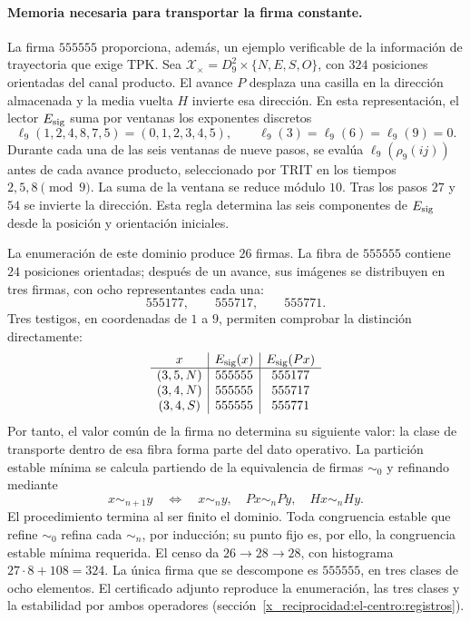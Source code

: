 \paragraph{Memoria necesaria para transportar la firma constante.}
La firma \(555555\) proporciona, además, un ejemplo verificable de
la información de trayectoria que exige TPK. Sea
\(\mathcal X_\times=D_9^2\times\{N,E,S,O\}\), con \(324\)
posiciones orientadas del canal producto. El avance \(P\) desplaza
una casilla en la dirección almacenada y la media vuelta \(H\)
invierte esa dirección. En esta representación, el lector
\(E_{\rm sig}\) suma por ventanas los exponentes discretos
\[
 \ell_9(1,2,4,8,7,5)=(0,1,2,3,4,5),\qquad
 \ell_9(3)=\ell_9(6)=\ell_9(9)=0.
\]
Durante cada una de las seis ventanas de nueve pasos, se evalúa
\(\ell_9(\rho_9(ij))\) antes de cada avance producto, seleccionado
por TRIT en los tiempos \(2,5,8\pmod9\). La suma de la ventana se
reduce módulo \(10\). Tras los pasos \(27\) y \(54\) se invierte
la dirección. Esta regla determina las seis componentes de
\(E_{\rm sig}\) desde la posición y orientación iniciales.

La enumeración de este dominio produce \(26\) firmas. La fibra de
\(555555\) contiene \(24\) posiciones orientadas; después de un
avance, sus imágenes se distribuyen en tres firmas, con ocho
representantes cada una:
\[
 555177,\qquad555717,\qquad555771.
\]
Tres testigos, en coordenadas de \(1\) a \(9\), permiten comprobar
la distinción directamente:
\[
\begin{array}{c|c|c}
x&E_{\rm sig}(x)&E_{\rm sig}(Px)\\\hline
(3,5,N)&555555&555177\\
(3,4,N)&555555&555717\\
(3,4,S)&555555&555771
\end{array}
\]
Por tanto, el valor común de la firma no determina su siguiente valor:
la clase de transporte dentro de esa fibra forma parte del dato
operativo. La partición estable mínima se calcula partiendo de la
equivalencia de firmas \(\sim_0\) y refinando mediante
\[
 x\sim_{n+1}y\quad\Longleftrightarrow\quad
 x\sim_n y,\quad Px\sim_n Py,\quad Hx\sim_n Hy.
\]
El procedimiento termina al ser finito el dominio. Toda congruencia
estable que refine \(\sim_0\) refina cada \(\sim_n\), por inducción;
su punto fijo es, por ello, la congruencia estable mínima requerida.
El censo da \(26\to28\to28\), con histograma
\(27\cdot8+108=324\). La única firma que se descompone es
\(555555\), en tres clases de ocho elementos. El certificado adjunto
reproduce la enumeración, las tres clases y la estabilidad por ambos
operadores (sección~\ref{x_reciprocidad:el-centro:registros}).

